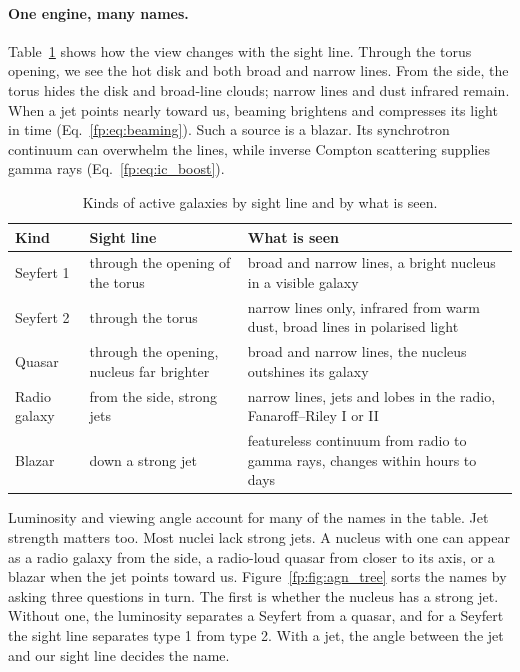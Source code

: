 \paragraph{One engine, many names.} Table~\ref{fp:tab:agn} shows how the view changes with the sight line. Through the torus opening, we see the hot disk and both broad and narrow lines. From the side, the torus hides the disk and broad-line clouds; narrow lines and dust infrared remain. When a jet points nearly toward us, beaming brightens and compresses its light in time (Eq.~\eqref{fp:eq:beaming}). Such a source is a blazar. Its synchrotron continuum can overwhelm the lines, while inverse Compton scattering supplies gamma rays (Eq.~\eqref{fp:eq:ic_boost}).
\begin{table}[htbp]
	\centering
	\small
	\begin{tabular}{@{}l >{\raggedright\arraybackslash}p{} >{\raggedright\arraybackslash}p{}@{}}
		\toprule
		\textbf{Kind} & \textbf{Sight line} & \textbf{What is seen} \\
		\midrule
		Seyfert 1 & through the opening of the torus & broad and narrow lines, a bright nucleus in a visible galaxy \\
		Seyfert 2 & through the torus & narrow lines only, infrared from warm dust, broad lines in polarised light \\
		Quasar & through the opening, nucleus far brighter & broad and narrow lines, the nucleus outshines its galaxy \\
		Radio galaxy & from the side, strong jets & narrow lines, jets and lobes in the radio, Fanaroff--Riley I or II \\
		Blazar & down a strong jet & featureless continuum from radio to gamma rays, changes within hours to days \\
		\bottomrule
	\end{tabular}
	\caption{Kinds of active galaxies by sight line and by what is seen.}
	\label{fp:tab:agn}
\end{table}

Luminosity and viewing angle account for many of the names in the table. Jet strength matters too. Most nuclei lack strong jets. A nucleus with one can appear as a radio galaxy from the side, a radio-loud quasar from closer to its axis, or a blazar when the jet points toward us. Figure~\ref{fp:fig:agn_tree} sorts the names by asking three questions in turn. The first is whether the nucleus has a strong jet. Without one, the luminosity separates a Seyfert from a quasar, and for a Seyfert the sight line separates type 1 from type 2. With a jet, the angle between the jet and our sight line decides the name.

